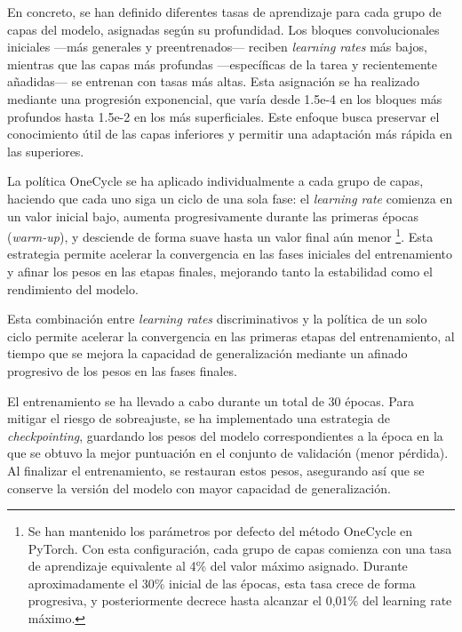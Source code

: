 En concreto, se han definido diferentes tasas de aprendizaje para cada grupo de capas del modelo, asignadas 
según su profundidad. Los bloques convolucionales iniciales ---más generales y preentrenados--- reciben 
\textit{learning rates} más bajos, mientras que las capas más profundas ---específicas de la tarea y 
recientemente añadidas--- se entrenan con tasas más altas. Esta asignación se ha realizado mediante una 
progresión exponencial, que varía desde 1.5e-4 en los bloques más profundos hasta 1.5e-2 en los más 
superficiales. Este enfoque busca preservar el conocimiento útil de las capas inferiores y permitir una 
adaptación más rápida en las superiores.

La política OneCycle se ha aplicado individualmente a cada grupo de capas, haciendo que cada uno siga un 
ciclo de una sola fase:
el \textit{learning rate} comienza en un valor inicial bajo, aumenta progresivamente durante las primeras 
épocas (\textit{warm-up}), y desciende de forma suave hasta un valor final aún menor
\footnote{
    Se han mantenido los parámetros por defecto del método OneCycle en PyTorch. Con esta configuración, cada 
    grupo de capas comienza con una tasa de aprendizaje equivalente al 4\% del valor máximo asignado. Durante 
    aproximadamente el 30\% inicial de las épocas, esta tasa crece de forma progresiva, y posteriormente 
    decrece hasta alcanzar el 0,01\% del learning rate máximo.
}. 
Esta estrategia permite acelerar la convergencia en las fases iniciales del entrenamiento y afinar los pesos 
en las etapas finales, mejorando tanto la estabilidad como el rendimiento del modelo.

Esta combinación entre \textit{learning rates} discriminativos y la política de un solo ciclo permite 
acelerar la convergencia en las primeras etapas del entrenamiento, al tiempo que se mejora la capacidad de 
generalización mediante un afinado progresivo de los pesos en las fases finales.

El entrenamiento se ha llevado a cabo durante un total de 30 épocas. Para mitigar el riesgo de sobreajuste,
se ha implementado una estrategia de \textit{checkpointing}, guardando los pesos del modelo correspondientes 
a la época en la que se obtuvo la mejor puntuación en el conjunto de validación (menor pérdida).
Al finalizar el entrenamiento, se restauran estos pesos, asegurando así que se conserve la versión del modelo 
con mayor capacidad de generalización.



